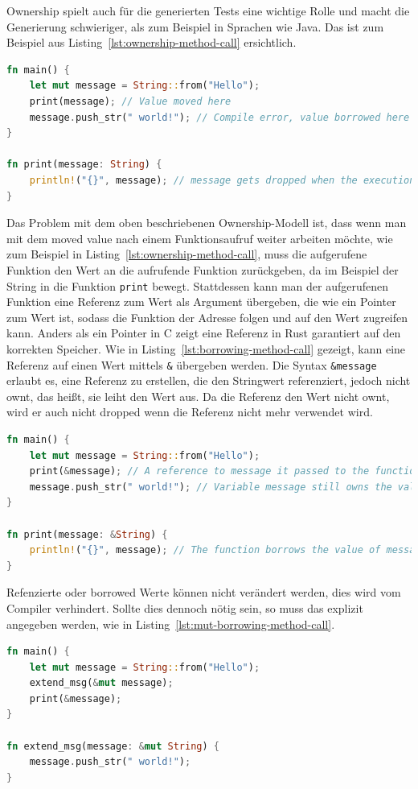 \documentclass{article}
\begin{document}
Ownership spielt auch für die generierten Tests eine wichtige Rolle und macht die Generierung schwieriger, als zum Beispiel in Sprachen wie Java. Das ist zum Beispiel aus Listing~\ref{lst:ownership-method-call} ersichtlich.
\begin{lstlisting}[language=Rust, style=boxed, caption=Transferring the ownership to a method, label=lst:ownership-method-call]
fn main() {
    let mut message = String::from("Hello");
    print(message); // Value moved here
    message.push_str(" world!"); // Compile error, value borrowed here after move
}

fn print(message: String) {
    println!("{}", message); // message gets dropped when the execution goes out of scope
}
\end{lstlisting}

Das Problem mit dem oben beschriebenen Ownership-Modell ist, dass wenn man mit dem moved value nach einem Funktionsaufruf weiter arbeiten möchte, wie zum Beispiel in Listing~\ref{lst:ownership-method-call}, muss die aufgerufene Funktion den Wert an die aufrufende Funktion zurückgeben, da im Beispiel der String in die Funktion \lstinline{print} bewegt. Stattdessen kann man der aufgerufenen Funktion eine Referenz zum Wert als Argument übergeben, die wie ein Pointer zum Wert ist, sodass die Funktion der Adresse folgen und auf den Wert zugreifen kann. Anders als ein Pointer in C zeigt eine Referenz in Rust garantiert auf den korrekten Speicher. Wie in Listing~\ref{lst:borrowing-method-call} gezeigt, kann eine Referenz auf einen Wert mittels \lstinline{&} übergeben werden. Die Syntax \lstinline{&message} erlaubt es, eine Referenz zu erstellen, die den Stringwert referenziert, jedoch nicht ownt, das heißt, sie leiht den Wert aus. Da die Referenz den Wert nicht ownt, wird er auch nicht dropped wenn die Referenz nicht mehr verwendet wird.

\begin{lstlisting}[language=Rust, style=boxed, caption=Transferring the ownership to a method, label=lst:borrowing-method-call]
fn main() {
    let mut message = String::from("Hello");
    print(&message); // A reference to message it passed to the function call
    message.push_str(" world!"); // Variable message still owns the value after the call
}

fn print(message: &String) {
    println!("{}", message); // The function borrows the value of message
}
\end{lstlisting}

Refenzierte oder borrowed Werte können nicht verändert werden, dies wird vom Compiler verhindert. Sollte dies dennoch nötig sein, so muss das explizit angegeben werden, wie in Listing~\ref{lst:mut-borrowing-method-call}.
\begin{lstlisting}[language=Rust, style=boxed, caption=Transferring the ownership to a method, label=lst:borrowing-method-call]
fn main() {
    let mut message = String::from("Hello");
    extend_msg(&mut message);
    print(&message);
}

fn extend_msg(message: &mut String) {
    message.push_str(" world!");
}
\end{lstlisting}
\end{document}
